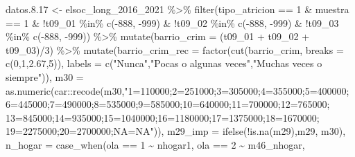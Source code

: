 \documentclass[
  12pt,
]{book}
\newenvironment{Shaded}{\begin{snugshade}}{\end{snugshade}}
\newcommand{\AttributeTok}[1]{\textcolor[rgb]{0.77,0.63,0.00}{#1}}
\newcommand{\DecValTok}[1]{\textcolor[rgb]{0.00,0.00,0.81}{#1}}
\newcommand{\FloatTok}[1]{\textcolor[rgb]{0.00,0.00,0.81}{#1}}
\newcommand{\FunctionTok}[1]{\textcolor[rgb]{0.00,0.00,0.00}{#1}}
\newcommand{\NormalTok}[1]{#1}
\newcommand{\OtherTok}[1]{\textcolor[rgb]{0.56,0.35,0.01}{#1}}
\newcommand{\SpecialCharTok}[1]{\textcolor[rgb]{0.00,0.00,0.00}{#1}}
\newcommand{\StringTok}[1]{\textcolor[rgb]{0.31,0.60,0.02}{#1}}
\begin{document}
\begin{Shaded}
\begin{Highlighting}[]
\NormalTok{datos.}\FloatTok{8.17} \OtherTok{\textless{}{-}}\NormalTok{ elsoc\_long\_2016\_2021 }\SpecialCharTok{\%\textgreater{}\%} 
  \FunctionTok{filter}\NormalTok{(tipo\_atricion }\SpecialCharTok{==} \DecValTok{1} \SpecialCharTok{\&}\NormalTok{ muestra }\SpecialCharTok{==} \DecValTok{1} \SpecialCharTok{\&}
           \SpecialCharTok{!}\NormalTok{t09\_01 }\SpecialCharTok{\%in\%} \FunctionTok{c}\NormalTok{(}\SpecialCharTok{{-}}\DecValTok{888}\NormalTok{, }\SpecialCharTok{{-}}\DecValTok{999}\NormalTok{) }\SpecialCharTok{\&} \SpecialCharTok{!}\NormalTok{t09\_02 }\SpecialCharTok{\%in\%} \FunctionTok{c}\NormalTok{(}\SpecialCharTok{{-}}\DecValTok{888}\NormalTok{, }\SpecialCharTok{{-}}\DecValTok{999}\NormalTok{) }\SpecialCharTok{\&} \SpecialCharTok{!}\NormalTok{t09\_03 }\SpecialCharTok{\%in\%} \FunctionTok{c}\NormalTok{(}\SpecialCharTok{{-}}\DecValTok{888}\NormalTok{, }\SpecialCharTok{{-}}\DecValTok{999}\NormalTok{)) }\SpecialCharTok{\%\textgreater{}\%} 
  \FunctionTok{mutate}\NormalTok{(}\AttributeTok{barrio\_crim =}\NormalTok{ (t09\_01 }\SpecialCharTok{+}\NormalTok{ t09\_02 }\SpecialCharTok{+}\NormalTok{ t09\_03)}\SpecialCharTok{/}\DecValTok{3}\NormalTok{) }\SpecialCharTok{\%\textgreater{}\%} 
  \FunctionTok{mutate}\NormalTok{(}\AttributeTok{barrio\_crim\_rec =} \FunctionTok{factor}\NormalTok{(}\FunctionTok{cut}\NormalTok{(barrio\_crim, }\AttributeTok{breaks =} \FunctionTok{c}\NormalTok{(}\DecValTok{0}\NormalTok{,}\DecValTok{1}\NormalTok{,}\FloatTok{2.67}\NormalTok{,}\DecValTok{5}\NormalTok{)),}
                                  \AttributeTok{labels =} \FunctionTok{c}\NormalTok{(}\StringTok{"Nunca"}\NormalTok{,}\StringTok{"Pocas o algunas veces"}\NormalTok{,}\StringTok{"Muchas veces o siempre"}\NormalTok{)),}
         \AttributeTok{m30 =} \FunctionTok{as.numeric}\NormalTok{(car}\SpecialCharTok{::}\FunctionTok{recode}\NormalTok{(m30,}\StringTok{"1=110000;2=251000;3=305000;4=355000;5=400000;}
\StringTok{                                           6=445000;7=490000;8=535000;9=585000;10=640000;11=700000;12=765000;}
\StringTok{                                           13=845000;14=935000;15=1040000;16=1180000;17=1375000;18=1670000;}
\StringTok{                                           19=2275000;20=2700000;NA=NA"}\NormalTok{)),}
         \AttributeTok{m29\_imp =} \FunctionTok{ifelse}\NormalTok{(}\SpecialCharTok{!}\FunctionTok{is.na}\NormalTok{(m29),m29, m30),}
         \AttributeTok{n\_hogar =} \FunctionTok{case\_when}\NormalTok{(ola }\SpecialCharTok{==} \DecValTok{1} \SpecialCharTok{\textasciitilde{}}\NormalTok{ nhogar1, ola }\SpecialCharTok{==} \DecValTok{2} \SpecialCharTok{\textasciitilde{}}\NormalTok{ m46\_nhogar,}

\end{Highlighting}
\end{Shaded}
\end{document}
